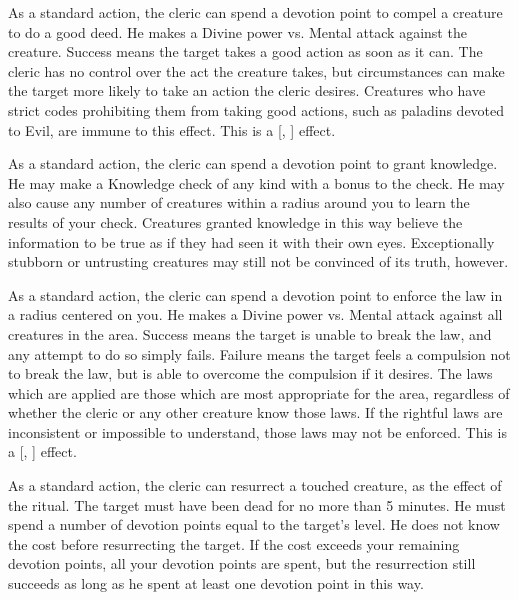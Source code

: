             As a standard action, the cleric can spend a devotion point to compel a creature to do a good deed.
            He makes a Divine power vs. Mental attack against the creature.
            Success means the target takes a good action as soon as it can.
            The cleric has no control over the act the creature takes, but circumstances can make the target more likely to take an action the cleric desires.
            Creatures who have strict codes prohibiting them from taking good actions, such as paladins devoted to Evil, are immune to this effect.
            This is a [, ] effect.

            As a standard action, the cleric can spend a devotion point to grant knowledge.
            He may make a Knowledge check of any kind with a  bonus to the check.
            He may also cause any number of creatures within a \arealarge radius around you to learn the results of your check.
            Creatures granted knowledge in this way believe the information to be true as if they had seen it with their own eyes.
            Exceptionally stubborn or untrusting creatures may still not be convinced of its truth, however.

            As a standard action, the cleric can spend a devotion point to enforce the law in a \arealarge radius  centered on you.
            He makes a Divine power vs. Mental attack against all creatures in the area.
            Success means the target is unable to break the law, and any attempt to do so simply fails.
            Failure means the target feels a compulsion not to break the law, but is able to overcome the compulsion if it desires.
            The laws which are applied are those which are most appropriate for the area, regardless of whether the cleric or any other creature know those laws.
            If the rightful laws are inconsistent or impossible to understand, those laws may not be enforced.
            This is a [, ] effect.

            As a standard action, the cleric can resurrect a touched creature, as the effect of the  ritual.
            The target must have been dead for no more than 5 minutes.
            He must spend a number of devotion points equal to the target's level.
            He does not know the cost before resurrecting the target.
            If the cost exceeds your remaining devotion points, all your devotion points are spent, but the resurrection still succeeds as long as he spent at least one devotion point in this way.

